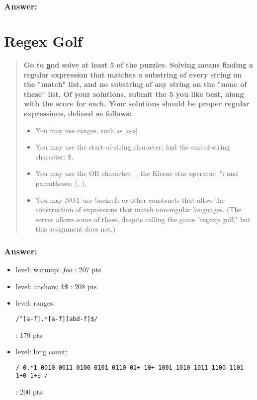 \documentclass[titlepage]{article}\usepackage[]{graphicx}\usepackage[]{color}
\begin{document}
\subsubsection*{Answer:}
\vspace{5cm}


\section{Regex Golf}
\begin{quote}
  \textbf{Go to \href{https://regex.alf.nu/} and solve at least 5 of the
  puzzles.  Solving means finding a regular expression that matches a substring
of every string on the "match" list, and no substring of any string on the
"none of these" list. Of your solutions, submit the 5 you like best, along
with the score for each.  Your solutions should be proper regular expressions,
defined as follows:}
\begin{itemize}
  \item You may use ranges, such as [a-z]
  \item You may use the start-of-string character: \^
    and the end-of-string character: \$.
  \item You may use the OR character: |; 
    the Kleene star operator: *; and parentheses: (, ).
  \item You may NOT use backrefs or other constructs that allow the construction of
        expressions that match non-regular languages.  (The server allows some of
        these, despite calling the game "regexp golf," but this assignment does not.)
\end{itemize}
\end{quote}
\subsubsection*{Answer:}
\begin{itemize}
  \item level: warmup; \( foo \) : 207 pts
  \item level: anchors; \( k\$ \) : 208 pts
  \item level: ranges; \begin{verbatim}/^[a-f].*[a-f][abd-f]$/ \end{verbatim}: 179 pts
  \item level: long count; \begin{verbatim}/ 0.*1 0010 0011 0100 0101 0110 01+ 10+ 1001 1010 1011 1100 1101 1+0 1+$ / \end{verbatim} : 200 pts
\end{itemize}
\vspace{5cm}
\end{document}
